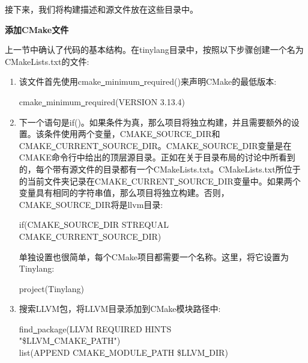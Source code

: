 接下来，我们将构建描述和源文件放在这些目录中。\par

\hspace*{\fill} \par %
\textbf{添加CMake文件}

上一节中确认了代码的基本结构。在tinylang目录中，按照以下步骤创建一个名为CMakeLists.txt的文件:\par

\begin{enumerate}
\item 该文件首先使用cmake\underline{~}minimum\underline{~}required()来声明CMake的最低版本:
\begin{tcolorbox}[colback=white,colframe=black]
cmake\underline{~}minimum\underline{~}required(VERSION 3.13.4)
\end{tcolorbox}

\item 下一个语句是if()。如果条件为真，那么项目将独立构建，并且需要额外的设置。该条件使用两个变量，CMAKE\underline{~}SOURCE\underline{~}DIR和CMAKE\underline{~}CURRENT\underline{~}SOURCE\underline{~}DIR。CMAKE\underline{~}SOURCE\underline{~}DIR变量是在CMAKE命令行中给出的顶层源目录。正如在关于目录布局的讨论中所看到的，每个带有源文件的目录都有一个CMakeLists.txt。CMakeLists.txt所位于的当前文件夹记录在CMAKE\underline{~}CURRENT\underline{~}SOURCE\underline{~}DIR变量中。如果两个变量具有相同的字符串值，那么项目将独立构建。否则，CMAKE\underline{~}SOURCE\underline{~}DIR将是llvm目录:
\begin{tcolorbox}[colback=white,colframe=black]
if(CMAKE\underline{~}SOURCE\underline{~}DIR STREQUAL CMAKE\underline{~}CURRENT\underline{~}SOURCE\underline{~}DIR)
\end{tcolorbox}

单独设置也很简单，每个CMake项目都需要一个名称。这里，将它设置为Tinylang:
\begin{tcolorbox}[colback=white,colframe=black]
\hspace*{0.5cm}project(Tinylang)
\end{tcolorbox}

\item 搜索LLVM包，将LLVM目录添加到CMake模块路径中:
\begin{tcolorbox}[colback=white,colframe=black]
\hspace*{0.5cm}find\underline{~}package(LLVM REQUIRED HINTS \\
\hspace*{1cm}"\${LLVM\underline{~}CMAKE\underline{~}PATH}") \\
\hspace*{0.5cm}list(APPEND CMAKE\underline{~}MODULE\underline{~}PATH \${LLVM\underline{~}DIR})
\end{tcolorbox}


\end{enumerate}
